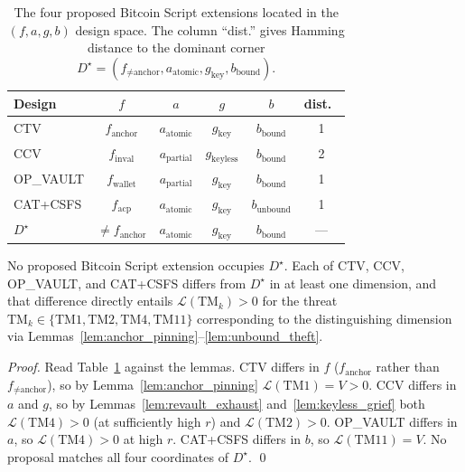 \begin{table}[t]
\centering
\caption{The four proposed Bitcoin Script extensions located in the
$(f, a, g, b)$ design space. The column ``dist.'' gives Hamming
distance to the dominant corner
$D^\star = (f_{\neq\text{anchor}}, a_{\text{atomic}}, g_{\text{key}},
b_{\text{bound}})$.}
\label{tab:design_space}
\begin{tabular}{@{}lccccc@{}}
\toprule
Design     & $f$                 & $a$                 & $g$                    & $b$                  & dist.\ \\
\midrule
CTV        & $f_{\text{anchor}}$ & $a_{\text{atomic}}$ & $g_{\text{key}}$       & $b_{\text{bound}}$   & 1 \\
CCV        & $f_{\text{inval}}$  & $a_{\text{partial}}$ & $g_{\text{keyless}}$ & $b_{\text{bound}}$   & 2 \\
OP\_VAULT  & $f_{\text{wallet}}$ & $a_{\text{partial}}$ & $g_{\text{key}}$     & $b_{\text{bound}}$   & 1 \\
CAT+CSFS   & $f_{\text{acp}}$    & $a_{\text{atomic}}$ & $g_{\text{key}}$       & $b_{\text{unbound}}$ & 1 \\
$D^\star$  & $\neq f_{\text{anchor}}$ & $a_{\text{atomic}}$ & $g_{\text{key}}$  & $b_{\text{bound}}$   & --- \\
\bottomrule
\end{tabular}
\end{table}

\begin{proposition}\label{thm:fee_inversion}
No proposed Bitcoin Script extension occupies $D^\star$. Each of CTV,
CCV, OP\_VAULT, and CAT+CSFS differs from $D^\star$ in at least one
dimension, and that difference directly entails
$\mathcal{L}(\mathrm{TM}_k) > 0$ for the threat
$\mathrm{TM}_k \in \{\mathrm{TM1}, \mathrm{TM2}, \mathrm{TM4},
\mathrm{TM11}\}$ corresponding to the distinguishing dimension via
Lemmas~\ref{lem:anchor_pinning}--\ref{lem:unbound_theft}.
\end{proposition}

\begin{proof}
Read Table~\ref{tab:design_space} against the lemmas. CTV differs in
$f$ ($f_{\text{anchor}}$ rather than $f_{\neq\text{anchor}}$), so by
Lemma~\ref{lem:anchor_pinning} $\mathcal{L}(\mathrm{TM1}) = V > 0$.
CCV differs in $a$ and $g$, so by
Lemmas~\ref{lem:revault_exhaust} and~\ref{lem:keyless_grief} both
$\mathcal{L}(\mathrm{TM4}) > 0$ (at sufficiently high $r$) and
$\mathcal{L}(\mathrm{TM2}) > 0$. OP\_VAULT differs in $a$, so
$\mathcal{L}(\mathrm{TM4}) > 0$ at high $r$. CAT+CSFS differs in $b$,
so $\mathcal{L}(\mathrm{TM11}) = V$. No proposal matches all four
coordinates of $D^\star$. \qed
\end{proof}

